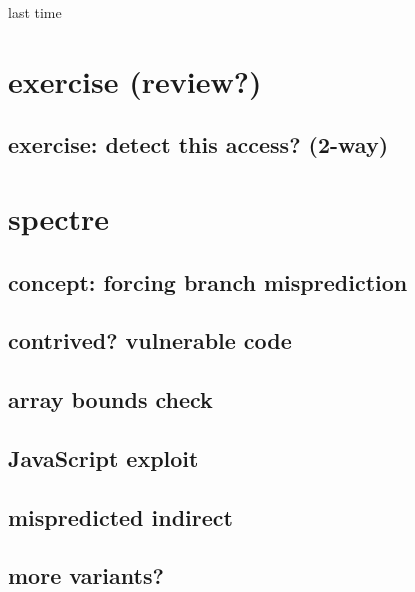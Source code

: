 \date{}
\title{}
\date{}

\begin{frame}
    \titlepage
\end{frame}



\begin{frame}{last time}
\end{frame}




\section{exercise (review?)}
\subsection{exercise: detect this access? (2-way)}


\section{spectre}
\subsection{concept: forcing branch misprediction}


\subsection{contrived? vulnerable code}


\subsection{array bounds check}


\subsection{JavaScript exploit}


\subsection{mispredicted indirect}


\subsection{more variants?}


